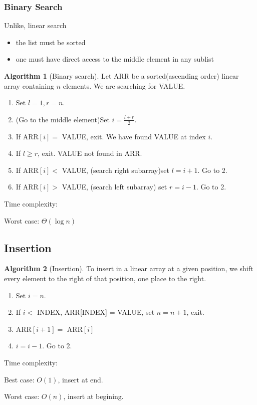 \documentclass[10pt, a4paper]{extarticle}
\theoremstyle{definition}
\newtheorem{alg}{Algorithm}
\begin{document}
\subsubsection{Binary Search}
Unlike, linear search
\begin{itemize}
	\item the list must be sorted
	\item one must have direct access to the middle element in any sublist
\end{itemize}
\begin{alg}[Binary search]
	Let ARR be a sorted(ascending order) linear array containing $n$ elements. We are searching for VALUE.
	\begin{enumerate}
		\item Set $l=1,r=n$.
		\item (Go to the middle element)Set $i=\frac{l+r}{2}$.
		\item If ARR$[i]=$ VALUE, exit. We have found VALUE at index $i$.
		\item If $l\geq r$, exit. VALUE not found in ARR.
		\item If ARR$[i]<$ VALUE, (search right subarray)set $l=i+1$. Go to 2.
		\item If ARR$[i]>$ VALUE, (search left subarray) set $r=i-1$. Go to 2.
	\end{enumerate}
	Time complexity:

	Worst case: $\Theta(\log n)$
	\hfill\\

\end{alg}

\subsection{Insertion}
\begin{alg}[Insertion]
	To insert in a linear array at a given position, we shift every element to the right of that position, one place to the right.
	\begin{enumerate}
		\item Set $i=n$.
		\item If $i<$ INDEX, ARR[INDEX] = VALUE, set $n=n+1$, exit.
		\item ARR$[i+1]=$ ARR$[i]$
		\item $i=i-1$. Go to 2.
	\end{enumerate}
	Time complexity:

	Best case: $O(1)$, insert at end.

	Worst case: $O(n)$, insert at begining.
\end{alg}
\end{document}
